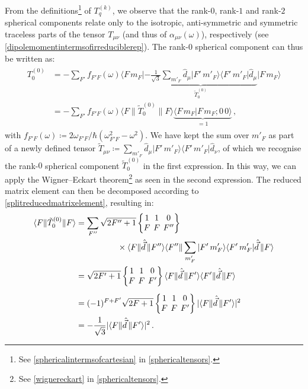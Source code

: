 \documentclass[../Thesis-IJspeert.tex]{subfiles}
\begin{document}
From the definitions\footnote{See \autoref{sphericalintermsofcartesian} in \autoref{sphericaltensors}.} of $T_q^{(k)}$, we observe that the rank-$0$, rank-$1$ and rank-$2$ spherical components relate only to the isotropic, anti-symmetric and symmetric traceless parts of the tensor $T_{\mu\nu}$ (and thus of $\alpha_{\mu\nu}(\omega)$), respectively (see \autoref{dipolemomentintermsofirreduciblerep}). The rank-$0$ spherical component can thus be written as:
\begin{align}
\begin{split}
T^{(0)}_0&=-\sum_{F'}f_{F'F}(\omega) \langle F\, m_F \vert \underbrace{-\frac{1}{\sqrt{3}} \sum_{m'_F} \hat{d}_\mu \vert F'\, m'_F \rangle\langle F'\, m'_F \vert \hat{d}_\mu }_{\tilde{T}^{(0)}_0}  \vert F\, m_F \rangle\\&= -\sum_{F'}f_{F'F}(\omega) \langle F\| \tilde{T}^{(0)}_0 \| F \rangle \underbrace{\langle F\, m_F \vert F\, m_F ; 0\,0 \rangle }_{=1} \,,
\end{split}
\end{align}
with $f_{F'F}(\omega)\coloneqq {2\omega_{F' F} }/{\hbar (\omega_{F' F}^2-\omega^2)}$. We have kept the sum over $m'_F$ as part of a newly defined tensor $\tilde{T}_{\mu\nu}\coloneqq\sum_{m'_F} \hat{d}_\mu \vert F'\, m'_F \rangle\langle F'\, m'_F \vert \hat{d}_\nu$, of which we recognise the rank-$0$ spherical component $\tilde{T}^{(0)}_0$ in the first expression. In this way, we can apply the Wigner--Eckart theorem\footnote{See \autoref{wignereckart} in \autoref{sphericaltensors}.} as seen in the second expression. The reduced matrix element can then be decomposed according to \autoref{splitreducedmatrixelement}, resulting in:
\begin{align}
\begin{split}
 \langle F\| \tilde{T}^{(0)}_0 \| F \rangle &= \sum_{F''}\sqrt{2F''+1} \tj{1}{1}{0}{F}{F}{F''}\\ &\hspace{5em}\times \langle F\| \hat{\vec{d}} \, \| F'' \rangle \langle F''\| \sum_{m'_F} \vert F'\, m'_F \rangle\langle F'\, m'_F \vert \hat{\vec{d}} \, \| F \rangle \\ &= \sqrt{2F'+1} \tj{1}{1}{0}{F}{F}{F'} \langle F\| \hat{\vec{d}} \, \| F' \rangle \langle F'\| \hat{\vec{d}} \, \| F \rangle \\[0.5em] &= (-1)^{F+F'}\sqrt{2F+1} \tj{1}{1}{0}{F}{F}{F'} \lvert \langle{F}\| \hat{\vec{d}} \, \|{F'}\rangle\rvert^2 \\ &=-\frac{1}{\sqrt{3}} \lvert \langle{F}\| \hat{\vec{d}} \, \|{F'}\rangle\rvert^2\,.
 \end{split}
\end{align}
\end{document}

